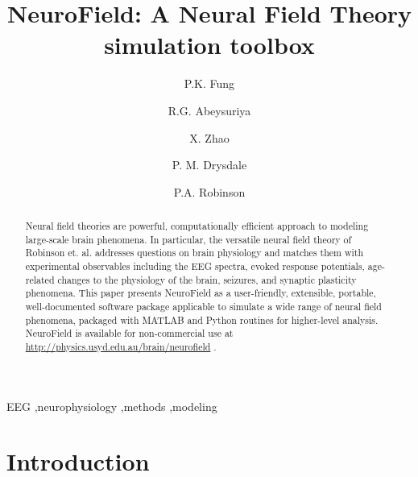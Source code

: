 \documentclass[preprint,review,10pt,authoryear,letterpaper]{elsarticle}
\begin{document}
\begin{frontmatter}

\title{NeuroField: A Neural Field Theory simulation toolbox}


\author{P.K. Fung}
\author{R.G. Abeysuriya\corref{}}
\author{X. Zhao\corref{}}
\author{P. M. Drysdale\corref{}}

\author{P.A. Robinson\corref{}}

\address{School of Physics, University of Sydney, New South Wales, Australia}


\begin{abstract}

Neural field theories are powerful, computationally efficient approach to modeling large-scale brain phenomena. In particular, the versatile neural field theory of Robinson et. al. addresses questions on brain physiology and matches them with experimental observables including the EEG spectra, evoked response potentials, age-related changes to the physiology of the brain, seizures, and synaptic plasticity phenomena. This paper presents NeuroField as a user-friendly, extensible, portable, well-documented software package applicable to simulate a wide range of neural field phenomena, packaged with MATLAB and Python routines for higher-level analysis. NeuroField is %
available for non-commercial use at \url{http://physics.usyd.edu.au/brain/neurofield}%
. 
\end{abstract}

\begin{keyword}
EEG \sep neurophysiology \sep methods \sep modeling

\end{keyword}

\end{frontmatter}


\section{Introduction}
\label{sec:introduction}
\end{document}
